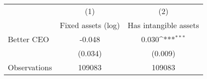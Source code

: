 {
\def\sym#1{\ifmmode^{#1}\else\(^{#1}\)\fi}
\begin{tabular}{l*{2}{c}}
\hline\hline
                    &\multicolumn{1}{c}{(1)}&\multicolumn{1}{c}{(2)}\\
                    &\multicolumn{1}{c}{Fixed assets (log)}&\multicolumn{1}{c}{Has intangible assets}\\
\hline
Better CEO          &      -0.048         &       0.030\sym{***}\\
                    &     (0.034)         &     (0.009)         \\
\hline
Observations        &      109083         &      109083         \\
\hline\hline
\end{tabular}
}

